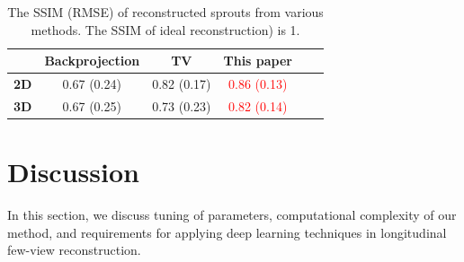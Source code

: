\documentclass[journal]{IEEEtran}
\begin{document}
\begin{table}[!h]
  \centering
  \caption{The SSIM (RMSE) of reconstructed sprouts from various
    methods. The SSIM of ideal reconstruction) is 1.}
\begin{tabular}{|l|c|c|c|c|c|}
\hline &
\textbf{Backprojection} & \textbf{TV} & \textbf{This paper}
 \\ \hline \textbf{2D} & 0.67 (0.24)
& 0.82 (0.17) & \textcolor{red}{0.86 (0.13)} \\ \hline \textbf{3D} & 0.67 (0.25) & 0.73 (0.23) & \textcolor{red}{0.82 (0.14)}
\\ \hline
\end{tabular}
\label{table:sprouts_ssim}
\end{table}



\section{Discussion}
\label{sec:discussion}
In this section, we discuss tuning of parameters, computational complexity of our method, and requirements for applying deep learning techniques in longitudinal few-view reconstruction.
\end{document}
